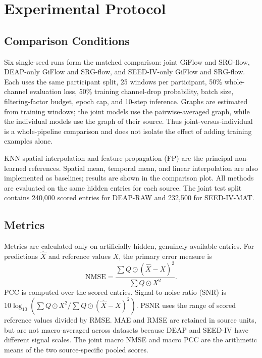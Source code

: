 \documentclass{article}
\begin{document}
\section{Experimental Protocol}

\subsection{Comparison Conditions}

Six single-seed runs form the matched comparison: joint GiFlow and SRG-flow,
DEAP-only GiFlow and SRG-flow, and SEED-IV-only GiFlow and SRG-flow. Each
uses the same participant split, 25 windows per participant, 50\%
whole-channel evaluation loss, 50\% training channel-drop probability,
batch size, filtering-factor budget, epoch cap, and 10-step inference.
Graphs are estimated from training windows; the joint models use the
pairwise-averaged graph, while the individual models use the graph of their
source. Thus joint-versus-individual is a whole-pipeline comparison and
does not isolate the effect of adding training examples alone.

KNN spatial interpolation and feature propagation (FP) are the principal
non-learned references. Spatial mean, temporal mean, and linear
interpolation are also implemented as baselines; results are shown in the
comparison plot. All methods are evaluated on the same hidden entries for
each source. The joint test split contains 240,000 scored entries for
DEAP-RAW and 232,500 for SEED-IV-MAT.

\subsection{Metrics}

Metrics are calculated only on artificially hidden, genuinely available
entries. For predictions $\widehat{X}$ and reference values $X$, the primary
error measure is
\begin{equation}
    \mathrm{NMSE}=
    \frac{\sum Q\odot(\widehat{X}-X)^2}
    {\sum Q\odot X^2}.
\end{equation}
PCC is computed over the scored entries. Signal-to-noise ratio (SNR) is
$10\log_{10}\left(\sum Q\odot X^2/
\sum Q\odot(\widehat{X}-X)^2\right)$. PSNR uses the range of scored
reference values divided by RMSE. MAE and RMSE are retained in source
units, but are not macro-averaged across datasets because DEAP and SEED-IV
have different signal scales. The joint macro NMSE and macro PCC are the
arithmetic means of the two source-specific pooled scores.
\end{document}
